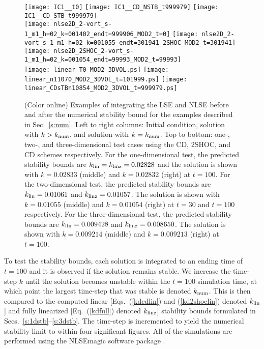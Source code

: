 \documentclass{article}
\begin{document}
\begin{figure}[p]
 \texttt{[image: IC1\_\_t0]}
 \texttt{[image: IC1\_\_CD\_NSTB\_t999979]}
 \texttt{[image: IC1\_\_CD\_STB\_t999979]}
 \\
 \texttt{[image: nlse2D\_2-vort\_s-1\_m1\_h=02\_k=001402\_endt=999906\_MOD2\_t=0]}
 \texttt{[image: nlse2D\_2-vort\_s-1\_m1\_h=02\_k=001055\_endt=301941\_2SHOC\_MOD2\_t=301941]}
 \texttt{[image: nlse2D\_2SHOC\_2-vort\_s-1\_m1\_h=02\_k=001054\_endt=99993\_MOD2\_t=99993]}
 \\[2.0ex]
 \texttt{[image: linear\_T0\_MOD2\_3DVOL.ps]}
 \texttt{[image: linear\_n11070\_MOD2\_3DVOL\_t=101999.ps]}
 \texttt{[image: linear\_CDsTBn10854\_MOD2\_3DVOL\_t=999979.ps]}
 \caption{(Color online) Examples of integrating the LSE and NLSE before and after the numerical stability bound for the examples described in Sec.~\ref{s:num}.  Left to right columns:  Initial condition, solution with $k > k_{\mbox{\scriptsize num}}$, and solution with $k = k_{\mbox{\scriptsize num}}$.  Top to bottom:  one-, two-, and three-dimensional test cases using the CD, 2SHOC, and CD schemes respectively. For the one-dimensional test, the predicted stability bounds are $k_{\mbox{\scriptsize lin}}=k_{\mbox{\scriptsize linz}}=0.02828$ and the solution is shown with $k=0.02833$ (middle) and $k=0.02832$ (right) at $t=100$. 
For the two-dimensional test, the predicted stability bounds are $k_{\mbox{\scriptsize lin}}=0.01061$ and $k_{\mbox{\scriptsize linz}}=0.01057$.  The solution is shown with $k=0.01055$ (middle) and $k=0.01054$ (right) at $t=30$ and 
$t=100$ respectively. 
For the three-dimensional test, the predicted stability bounds are $k_{\mbox{\scriptsize lin}}=0.009428$ and $k_{\mbox{\scriptsize linz}}=0.008650$.  The solution is shown with $k=0.009214$ (middle) and $k=0.009213$ (right) at $t=100$.\label{f:results}}
\end{figure} 


To test the stability bounds, each solution is integrated to an ending time of $t=100$ and it is observed if the solution remains stable.  We increase the time-step $k$ until the solution becomes unstable within the $t=100$ simulation time, at which point the largest time-step that was stable is denoted $k_{\mbox{\scriptsize num}}$.  This is then compared to the computed linear [Eqs.~(\ref{kdcdlin}) and (\ref{kd2shoclin}) denoted $k_{\mbox{\scriptsize lin}}$] and fully linearized [Eq.~(\ref{kdfull}) denoted $k_{\mbox{\scriptsize linz}}$] stability bounds formulated in Secs.~\ref{s:1dstb}--\ref{s:3dstb}.  The time-step is incremented to yield the numerical stability limit to within four significant figures.  All of the simulations are performed using the NLSEmagic software package \cite{NLSEMAGIC}.
  
\end{document}
